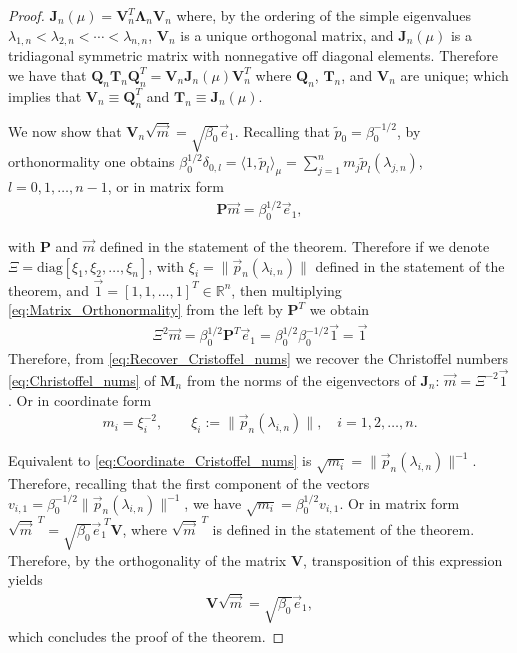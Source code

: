 \documentclass[english,12pt]{ttuthes}
\begin{document}
\begin{proof}
$\mathbf{J}_n(\mu)=\mathbf{V}_n^T\mathbf{\Lambda}_n\mathbf{V}_n$ where, by the
ordering of the simple eigenvalues
$\lambda_{1,n}<\lambda_{2,n}<\cdots<\lambda_{n,n}$, $\mathbf{V}_n$ is a unique
orthogonal matrix, and $\mathbf{J}_n(\mu)$ is a tridiagonal symmetric
matrix with nonnegative off diagonal elements. Therefore we have that
$\mathbf{Q}_n\mathbf{T}_n\mathbf{Q}_n^T=\mathbf{V}_n\mathbf{J}_n(\mu)\mathbf{V}_n^T$
where $\mathbf{Q}_n$, $\mathbf{T}_n$, and $\mathbf{V}_n$ are
unique; which implies that $\mathbf{V}_n\equiv\mathbf{Q}_n^T$ and
$\mathbf{T}_n\equiv\mathbf{J}_n(\mu)$.   

We now show that
$\mathbf{V}_n\sqrt{\vec{m}}=\sqrt{\beta_0}\vec{e}_1$. Recalling that
$\tilde{p}_0=\beta_0^{-1/2}$, by orthonormality one obtains
$\beta_0^{1/2}\delta_{0,l}=\langle1,\tilde{p}_l\rangle_\mu=\sum_{j=1}^nm_j\tilde{p}_l(\lambda_{j,n})$, 
$l=0,1,\ldots,n-1$, or in matrix form 
%
\begin{align}\label{eq:Matrix_Orthonormality}
  \mathbf{P}\vec{m}=\beta_0^{1/2}\vec{e}_1,
\end{align}

% 
with $\mathbf{P}$ and $\vec{m}$ defined in the statement of the
theorem. Therefore if we denote $\Xi=\text{diag}[\xi_1,\xi_2,\ldots,\xi_n]$, with
$\xi_i=\|\vec{p}_n(\lambda_{i,n})\|$ defined in the statement of the theorem,
and $\vec{1}=[1,1,\ldots,1]^T\in\mathbb{R}^n$, then multiplying
\eqref{eq:Matrix_Orthonormality} from the left by $\mathbf{P}^T$ we
obtain 
%
\begin{align}\label{eq:Recover_Cristoffel_nums}
  \Xi^2\vec{m}=\beta_0^{1/2}\mathbf{P}^T\vec{e}_1=\beta_0^{1/2}\beta_0^{-1/2}\vec{1}=\vec{1}
\end{align}
%
Therefore, from \eqref{eq:Recover_Cristoffel_nums} we recover the
Christoffel numbers \eqref{eq:Christoffel_nums} of $\mathbf{M}_n$ from
the norms of the eigenvectors of $\mathbf{J}_n$:
$\vec{m}=\Xi^{-2}\vec{1}$. Or in coordinate form  
%
\begin{align}\label{eq:Coordinate_Cristoffel_nums}
  m_i=\xi_i^{-2}, \qquad \xi_i:=\|\vec{p}_n(\lambda_{i,n})\|, \quad i=1,2,\ldots,n.
\end{align}
%

Equivalent to \eqref{eq:Coordinate_Cristoffel_nums} is
$\sqrt{m_i}=\|\vec{p}_n(\lambda_{i,n})\|^{-1}$. Therefore, recalling that the first component
of the vectors $v_{i,1}=\beta_0^{-1/2}\|\vec{p}_n(\lambda_{i,n})\|^{-1}$, we have
$\sqrt{m_i}=\beta_0^{1/2}v_{i,1}$. Or in matrix form
$\sqrt{\vec{m}}^{\;T}=\sqrt{\beta_0}\vec{e}_1^{\;T}\mathbf{V}$, where
$\sqrt{\vec{m}}^{\;T}$ is defined in the statement of the
theorem. Therefore, by the orthogonality of the matrix $\mathbf{V}$,
transposition of this expression yields    
%
\begin{align}
  \mathbf{V}\sqrt{\vec{m}}=\sqrt{\beta_0}\vec{e}_1,
\end{align}
%
which concludes the proof of the theorem.
%
\end{proof}
\end{document}
